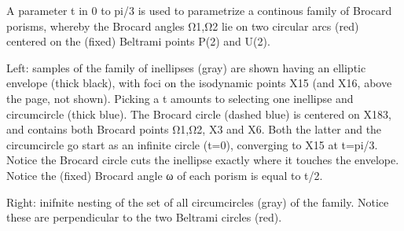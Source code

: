 A parameter t in 0 to pi/3 is used to parametrize a continous family of Brocard porisms, whereby the Brocard angles Ω1,Ω2 lie on two circular arcs (red) centered on the (fixed) Beltrami points P(2) and U(2).

Left: samples of the family of inellipses (gray) are shown having an elliptic envelope (thick black), with foci on the isodynamic points X15 (and X16, above the page, not shown). Picking a t amounts to selecting one inellipse and circumcircle (thick blue). The Brocard circle (dashed blue) is centered on X183, and contains both Brocard points Ω1,Ω2, X3 and X6. Both the latter and the circumcircle go start as an infinite circle (t=0), converging to X15 at t=pi/3. Notice the Brocard circle cuts the inellipse exactly where it touches the envelope. Notice the (fixed) Brocard angle ω of each porism is equal to t/2.

Right: inifnite nesting of the set of all circumcircles (gray) of the family. Notice these are perpendicular to the two Beltrami circles (red).